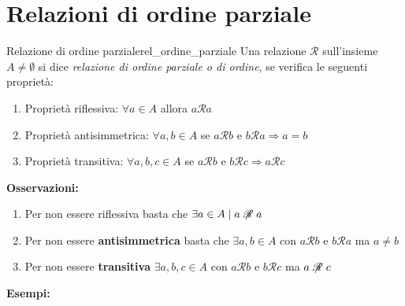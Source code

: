 \documentclass[12pt, letterpaper]{report}
\newcounter{definition}
\newcommand{\nmu}{}
\begin{document}
  		\section{Relazioni di ordine parziale}
  		 \begin{definition}{\nmu Relazione di ordine parziale}{rel_ordine_parziale}
  			Una relazione $\mathscr{R}$ sull'insieme $A \neq \emptyset$ si dice \textit{relazione di ordine parziale o di ordine}, se verifica le seguenti proprietà:
  			\begin{enumerate}
  				\item Proprietà riflessiva: $\forall a \in A$ allora $a\mathscr{R}a$
  				\item Proprietà antisimmetrica: $\forall a,b \in A$ se $a\mathscr{R}b$ e $b\mathscr{R}a \Rightarrow a=b$
  				\item Proprietà transitiva: $\forall a,b,c \in A$ se $a\mathscr{R}b$ e $b\mathscr{R}c \Rightarrow a\mathscr{R}c$
  			\end{enumerate}
  		\end{definition}
  		\textbf{Osservazioni:}
  		\begin{enumerate}
  			\item Per non essere riflessiva basta che $\exists a \in A \mid a \centernot{\mathscr{R}}a$
  			\item Per non essere \textbf{antisimmetrica} basta che $\exists a,b \in A$ con $a\mathscr{R}b$ e $b\mathscr{R}a$ ma $a \neq b$
  			\item Per non essere \textbf{transitiva} $\exists a,b,c \in A$ con $a\mathscr{R}b$ e $b\mathscr{R}c$ ma $a\centernot{\mathscr{R}}c$
  		\end{enumerate}
  		\textbf{Esempi:}
\end{document}
